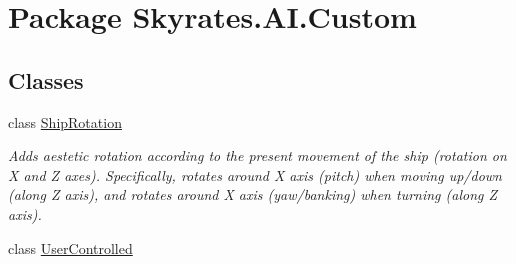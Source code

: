 \hypertarget{namespace_skyrates_1_1_a_i_1_1_custom}{\section{Package Skyrates.\-A\-I.\-Custom}
\label{namespace_skyrates_1_1_a_i_1_1_custom}
}
\subsection*{Classes}
\begin{DoxyCompactItemize}
\item 
class \hyperlink{class_skyrates_1_1_a_i_1_1_custom_1_1_ship_rotation}{Ship\-Rotation}
\begin{DoxyCompactList}\small\item\em Adds aestetic rotation according to the present movement of the ship (rotation on X and Z axes). Specifically, rotates around X axis (pitch) when moving up/down (along Z axis), and rotates around X axis (yaw/banking) when turning (along Z axis). \end{DoxyCompactList}\item 
class \hyperlink{class_skyrates_1_1_a_i_1_1_custom_1_1_user_controlled}{User\-Controlled}
\end{DoxyCompactItemize}
